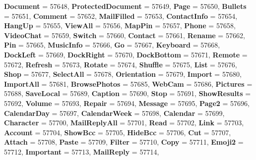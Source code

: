 \begin{DoxyCompactItemize}
{\bfseries Document} = 57648, 
\newline
{\bfseries Protected\+Document} = 57649, 
{\bfseries Page} = 57650, 
{\bfseries Bullets} = 57651, 
{\bfseries Comment} = 57652, 
\newline
{\bfseries Mail\+Filled} = 57653, 
{\bfseries Contact\+Info} = 57654, 
{\bfseries Hang\+Up} = 57655, 
{\bfseries View\+All} = 57656, 
\newline
{\bfseries Map\+Pin} = 57657, 
{\bfseries Phone} = 57658, 
{\bfseries Video\+Chat} = 57659, 
{\bfseries Switch} = 57660, 
\newline
{\bfseries Contact} = 57661, 
{\bfseries Rename} = 57662, 
{\bfseries Pin} = 57665, 
{\bfseries Music\+Info} = 57666, 
\newline
{\bfseries Go} = 57667, 
{\bfseries Keyboard} = 57668, 
{\bfseries Dock\+Left} = 57669, 
{\bfseries Dock\+Right} = 57670, 
\newline
{\bfseries Dock\+Bottom} = 57671, 
{\bfseries Remote} = 57672, 
{\bfseries Refresh} = 57673, 
{\bfseries Rotate} = 57674, 
\newline
{\bfseries Shuffle} = 57675, 
{\bfseries List} = 57676, 
{\bfseries Shop} = 57677, 
{\bfseries Select\+All} = 57678, 
\newline
{\bfseries Orientation} = 57679, 
{\bfseries Import} = 57680, 
{\bfseries Import\+All} = 57681, 
{\bfseries Browse\+Photos} = 57685, 
\newline
{\bfseries Web\+Cam} = 57686, 
{\bfseries Pictures} = 57688, 
{\bfseries Save\+Local} = 57689, 
{\bfseries Caption} = 57690, 
\newline
{\bfseries Stop} = 57691, 
{\bfseries Show\+Results} = 57692, 
{\bfseries Volume} = 57693, 
{\bfseries Repair} = 57694, 
\newline
{\bfseries Message} = 57695, 
{\bfseries Page2} = 57696, 
{\bfseries Calendar\+Day} = 57697, 
{\bfseries Calendar\+Week} = 57698, 
\newline
{\bfseries Calendar} = 57699, 
{\bfseries Character} = 57700, 
{\bfseries Mail\+Reply\+All} = 57701, 
{\bfseries Read} = 57702, 
\newline
{\bfseries Link} = 57703, 
{\bfseries Account} = 57704, 
{\bfseries Show\+Bcc} = 57705, 
{\bfseries Hide\+Bcc} = 57706, 
\newline
{\bfseries Cut} = 57707, 
{\bfseries Attach} = 57708, 
{\bfseries Paste} = 57709, 
{\bfseries Filter} = 57710, 
\newline
{\bfseries Copy} = 57711, 
{\bfseries Emoji2} = 57712, 
{\bfseries Important} = 57713, 
{\bfseries Mail\+Reply} = 57714, 

\end{DoxyCompactItemize}
